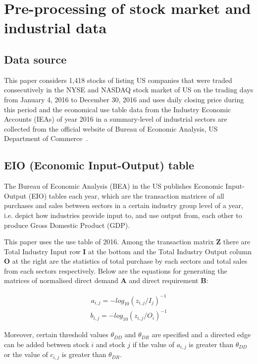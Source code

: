 \chapter[Pre-processing of data]{Pre-processing of stock market and industrial data}
\section{Data source}
This paper considers 1,418 stocks of listing US companies that were traded consecutively in the NYSE and NASDAQ stock market of US on the trading days from January 4, 2016 to December 30, 2016 and uses daily closing price during this period and the economical use table data from the Industry Economic Accounts (IEAs) of year 2016 in a summary-level of industrial sectors are collected from the official website of Bureau of Economic Analysis, US Department of Commerce~\cite{bea}.

\section{EIO (Economic Input-Output) table}
The Bureau of Economic Analysis (BEA) in the US publishes Economic Input-Output (EIO) tables each year, which are the transaction matrices of all purchases and sales between sectors in a certain industry group level of a year, i.e. depict how industries provide input to, and use output from, each other to produce Gross Domestic Product (GDP).

This paper uses the use table of 2016. Among the transaction matrix \textbf{Z} there are Total Industry Input row \textbf{I} at the bottom and the Total Industry Output column \textbf{O} at the right are the statistics of total purchase by each sectors and total sales from each sectors respectively. Below are the equations for generating the matrices of normalised direct demand \textbf{A} and direct requirement \textbf{B}:

\begin{eqnarray}\label{equ:eio_i}
a_{i,j} = -log_{10}(z_{i,j} / I_j)^{-1}
\end{eqnarray}
\begin{eqnarray}\label{equ:eio_o}
b_{i,j} = -log_{10}(z_{i,j} / O_i)^{-1}
\end{eqnarray}

Moreover, certain threshold values $\theta_{DD}$ and $\theta_{DR}$ are specified and a directed edge can be added between stock $i$ and stock $j$ if the value of $a_{i,j}$ is greater than $\theta_{DD}$ or the value of $c_{i,j}$ is greater than $\theta_{DR}$.

